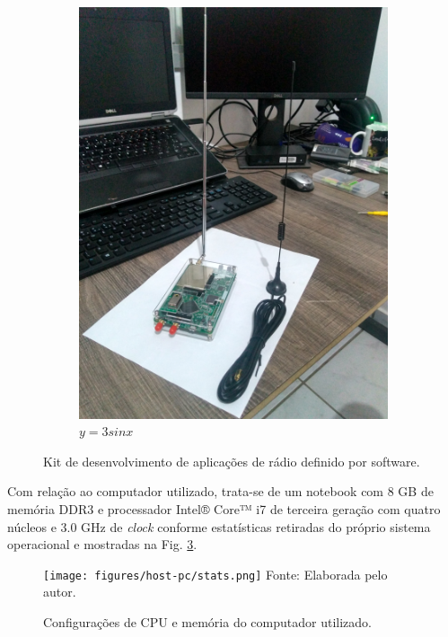 \documentclass[
  12pt,				%
  openright,			%
  twoside,			%
  a4paper,			%
  english,			%
  french,				%
  spanish,			%
  brazil,				%
  ]{abntex2}
\begin{document}
\begin{figure}[ht]
\begin{subfigure}[b]{0.45\linewidth}
    \includegraphics[width=\linewidth]{figures/hackrf/hack_rf_kit.jpg}
    \caption{$y=3sinx$}
    \label{fig:hack_rf_kit}
  \end{subfigure}
  \caption{Kit de desenvolvimento de aplicações de rádio definido por software.}
  \label{fig:hack_rf_hdk}
\end{figure}

\newpage
Com relação ao computador utilizado, trata-se de um notebook com 8 GB de memória DDR3 e processador Intel® Core™ i7 de terceira geração com quatro
núcleos e 3.0 GHz de \textit{clock} conforme estatísticas retiradas do próprio sistema operacional e mostradas na Fig. \ref{fig:host_pc_stats}.

\begin{figure}[!htb]
  \centering
  \caption{Configurações de CPU e memória do computador utilizado.}
  \texttt{[image: figures/host-pc/stats.png]}
  Fonte: Elaborada pelo autor.
  \label{fig:host_pc_stats}
\end{figure}
\end{document}
